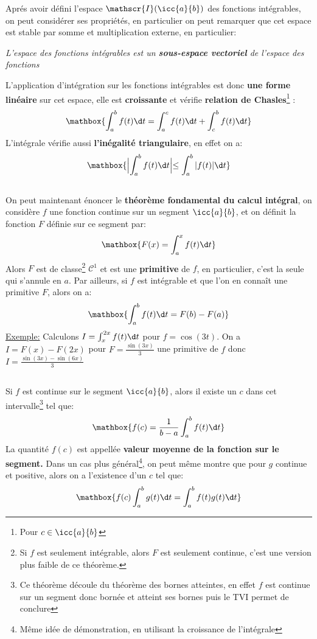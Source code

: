 Aprés avoir défini l'espace \(\mathscr{I}(\icc{a}{b})\) des fonctions intégrables, on peut considérer ses propriétés, en particulier on peut remarquer que cet espace est stable par somme et multiplication externe, en particulier:
\begin{center}
   \textit{L'espace des fonctions intégrables est un \textbf{sous-espace vectoriel} de l'espace des fonctions}
\end{center}
L'application d'intégration sur les fonctions intégrables est donc \textbf{une forme linéaire} sur cet espace, elle est \textbf{croissante} et vérifie \textbf{relation de Chasles}\footnote[3]{Pour \(c \in \icc{a}{b}\)} :
\[
   \mathbox{\int_{a}^{b} f(t) \d t = \int_{a}^{c} f(t) \d t + \int_{c}^{b} f(t) \d t}   
\]
L'intégrale vérifie aussi \textbf{l'inégalité triangulaire}, en effet on a:
\[
   \mathbox{\Bigl| \int_{a}^{b} f(t) \d t \Bigl| \leq \int_{a}^{b} |f(t)| \d t}
\]

\subsection*{}

On peut maintenant énoncer le \textbf{théorème fondamental du calcul intégral}, on considère \(f\) une fonction continue sur un segment \(\icc{a}{b}\), et on définit la fonction \(F\) définie sur ce segment par:
\[
   \mathbox{F(x) = \int_{a}^{x} f(t) \d t}  
\]
Alors \(F\) est de classe\footnote[4]{Si \(f\) est seulement intégrable, alors \(F\) est seulement continue, c'est une version plus faible de ce théorème.} \(\mathscr{C}^1\) et est une \textbf{primitive} de \(f\), en particulier, c'est la seule qui s'annule en \(a\).\+
Par ailleurs, si \(f\) est intégrable et que l'on en connaît une primitive \(F\), alors on a:
\[
   \mathbox{\int_{a}^{b} f(t) \d t = F(b) - F(a)}  
\]
\underline{Exemple:} Calculons \(I = \int_{x}^{2x} f(t) \d t\) pour \(f = \cos(3t)\). On a \(I = F(x) - F(2x)\) pour \(F = \frac{\sin(3x)}{3}\) une primitive de \(f\) donc \(I = \frac{\sin(3x) - \sin(6x)}{3}\)

\subsection*{}
Si \(f\) est continue sur le segment \(\icc{a}{b}\), alors il existe un \(c\) dans cet intervalle\footnote[1]{Ce théorème découle du théorème des bornes atteintes, en effet \(f\) est continue sur un segment donc bornée et atteint ses bornes puis le TVI permet de conclure} tel que:
\[
   \mathbox{f(c) = \frac{1}{b-a}\int_{a}^{b} f(t) \d t}  
\]
La quantité \(f(c)\) est appellée \textbf{valeur moyenne de la fonction sur le segment.}
Dans un cas plus général\footnote[2]{Même idée de démonstration, en utilisant la croissance de l'intégrale}, on peut même montre que pour \(g\) continue et positive, alors on a l'existence d'un \(c\) tel que:
\[
   \mathbox{f(c)\int_{a}^{b} g(t) \d t = \int_{a}^{b} f(t)g(t) \d t}  
\]

